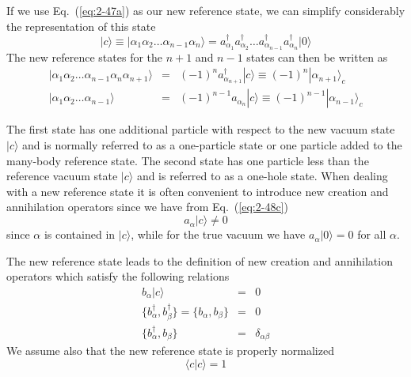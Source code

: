 \documentclass[graybox,sectrefs,envcountresetchap,open=right]{svmonodo}
\begin{document}
If we use Eq.~(\ref{eq:2-47a}) as our new reference state, we can simplify considerably the representation of 
this state
\begin{equation}
	|c\rangle  \equiv |\alpha_1\alpha_2\dots\alpha_{n-1}\alpha_n\rangle =
		a_{\alpha_1}^\dagger a_{\alpha_2}^\dagger \dots a_{\alpha_{n-1}}^\dagger a_{\alpha_n}^\dagger |0\rangle  \label{eq:2-48a}
\end{equation}
The new reference states for the $n+1$ and $n-1$ states can then be written as
\begin{eqnarray}
	|\alpha_1\alpha_2\dots\alpha_{n-1}\alpha_n\alpha_{n+1}\rangle &=& (-1)^n a_{\alpha_{n+1}}^\dagger |c\rangle 
		\equiv (-1)^n |\alpha_{n+1}\rangle_c \label{eq:2-48b} \\
	|\alpha_1\alpha_2\dots\alpha_{n-1}\rangle &=& (-1)^{n-1} a_{\alpha_n} |c\rangle  
		\equiv (-1)^{n-1} |\alpha_{n-1}\rangle_c \label{eq:2-48c} 
\end{eqnarray}





The first state has one additional particle with respect to the new vacuum state
$|c\rangle $  and is normally referred to as a one-particle state or one particle added to the 
many-body reference state. 
The second state has one particle less than the reference vacuum state  $|c\rangle $ and is referred to as
a one-hole state. 
When dealing with a new reference state it is often convenient to introduce 
new creation and annihilation operators since we have 
from Eq.~(\ref{eq:2-48c})
\begin{equation}
	a_\alpha |c\rangle  \neq 0 \label{eq:2-49}
\end{equation}
since  $\alpha$ is contained  in $|c\rangle $, while for the true vacuum we have 
$a_\alpha |0\rangle  = 0$ for all $\alpha$.

The new reference state leads to the definition of new creation and annihilation operators
which satisfy the following relations
\begin{eqnarray}
	b_\alpha |c\rangle  &=& 0 \label{eq:2-50a} \\
	\{b_\alpha^\dagger , b_\beta^\dagger \} = \{b_\alpha , b_\beta \} &=& 0 \nonumber  \\
	\{b_\alpha^\dagger , b_\beta \} &=& \delta_{\alpha \beta} \label{eq:2-50c}
\end{eqnarray}
We assume also that the new reference state is properly normalized
\begin{equation}
	\langle c | c \rangle = 1 \label{eq:2-51}
\end{equation}
\end{document}
